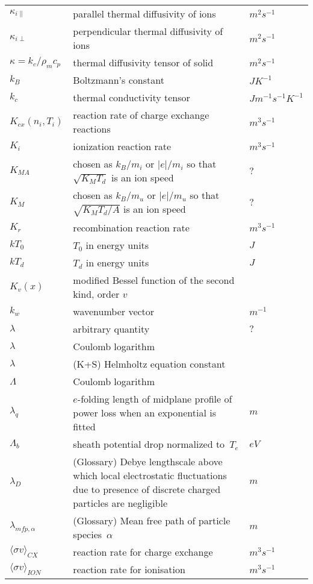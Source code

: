 \begin{longtable}{|p{3.0cm}|p{10.0cm}|p{3.0cm}|}
$\kappa_{i\|}$ & parallel thermal diffusivity of ions & $m^2 s^{-1}$ \\
$\kappa_{i\perp}$ & perpendicular thermal diffusivity of ions & $m^2 s^{-1}$ \\
$\kappa=k_c/\rho_m c_p$ & thermal diffusivity tensor of solid & $m^2 s^{-1}$ \\
$k_B$ & Boltzmann's constant  & $J K^{-1}$ \\
$k_c$ & thermal conductivity tensor  & $J m^{-1} s^{-1} K^{-1}$ \\
$K_{cx}\left( n_i, T_i \right)$ & reaction rate of charge exchange reactions  & $m^3 s^{-1}$ \\
$K_i$ & ionization reaction rate  & $m^3 s^{-1}$ \\
$K_{MA}$ & chosen as $k_B/m_i$ or $|e|/m_i$ so that $\sqrt{K_MT_d}$ is an ion speed & $?$ \\
$K_M$ & chosen as $k_B/m_u$ or $|e|/m_u$ so that $\sqrt{K_MT_d/A}$ is an ion speed & $?$ \\
$K_r$ & recombination reaction rate  & $m^3 s^{-1}$ \\
$kT_0$ & $T_0$ in energy units  & $J$ \\
$kT_d$ & $T_d$ in energy units  & $J$ \\
$K_v(x)$ & modified Bessel function of the second kind, order $v$  & \\
$k_w$ & wavenumber vector & $m^{-1}$ \\
$\lambda$ & arbitrary quantity  & $?$ \\
$\lambda$ & Coulomb logarithm & \\
$\lambda$ &  (K+S) Helmholtz equation constant & \\
$\Lambda$ & Coulomb logarithm & \\
$\lambda_q$ & $e$-folding length of midplane profile of power loss when an exponential is fitted & $m$ \\
$\Lambda_b$ & sheath potential drop normalized to~$T_e$  & $eV$ \\
$\lambda_D$ & (Glossary) Debye lengthscale above which local electrostatic fluctuations due to presence of discrete charged particles are negligible  & $m$ \\
$\lambda_{mfp,\alpha}$ & (Glossary) Mean free path of particle species~$\alpha$ & $m$  \\
$\langle \sigma v \rangle_{CX}$ & reaction rate for charge exchange  & $m^3 s^{-1}$ \\
$\langle \sigma v \rangle_{ION}$ & reaction rate for ionisation  & $m^3 s^{-1}$ \\

\end{longtable}
